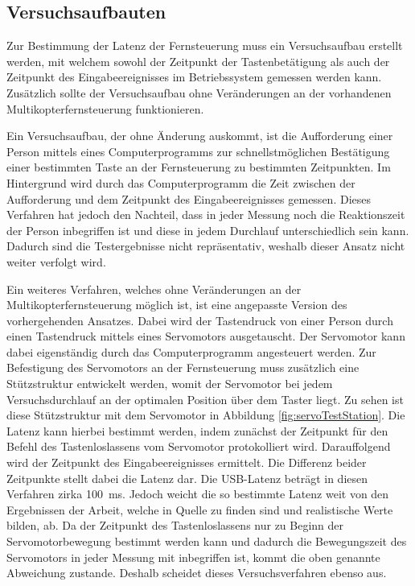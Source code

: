\subsection{Versuchsaufbauten}
Zur Bestimmung der Latenz der Fernsteuerung muss ein Versuchsaufbau erstellt werden, mit welchem sowohl der Zeitpunkt der Tastenbetätigung als auch der Zeitpunkt des Eingabeereignisses im Betriebssystem gemessen werden kann. Zusätzlich sollte der Versuchsaufbau ohne Veränderungen an der vorhandenen Multikopterfernsteuerung funktionieren.

Ein Versuchsaufbau, der ohne Änderung auskommt, ist die Aufforderung einer Person mittels eines Computerprogramms zur schnellstmöglichen Bestätigung einer bestimmten Taste an der Fernsteuerung zu bestimmten Zeitpunkten. Im Hintergrund wird durch das Computerprogramm die Zeit zwischen der Aufforderung und dem Zeitpunkt des Eingabeereignisses gemessen. Dieses Verfahren hat jedoch den Nachteil, dass in jeder Messung noch die Reaktionszeit der Person inbegriffen ist und diese in jedem Durchlauf unterschiedlich sein kann. Dadurch sind die Testergebnisse nicht repräsentativ, weshalb dieser Ansatz nicht weiter verfolgt wird.

Ein weiteres Verfahren, welches ohne Veränderungen an der Multikopterfernsteuerung möglich ist, ist eine angepasste Version des vorhergehenden Ansatzes. Dabei wird der Tastendruck von einer Person durch einen Tastendruck mittels eines Servomotors ausgetauscht. Der Servomotor kann dabei eigenständig durch das Computerprogramm angesteuert werden. Zur Befestigung des Servomotors an der Fernsteuerung muss zusätzlich eine Stützstruktur entwickelt werden, womit der Servomotor bei jedem Versuchsdurchlauf an der optimalen Position über dem Taster liegt. Zu sehen ist diese Stützstruktur mit dem Servomotor in Abbildung \ref{fig:servoTestStation}. Die Latenz kann hierbei bestimmt werden, indem zunächst der Zeitpunkt für den Befehl des Tastenloslassens vom Servomotor protokolliert wird. Darauffolgend wird der Zeitpunkt des Eingabeereignisses ermittelt. Die Differenz beider Zeitpunkte stellt dabei die Latenz dar. Die \acs{USB}-Latenz beträgt in diesen Verfahren zirka 100~ms. Jedoch weicht die so bestimmte Latenz weit von den Ergebnissen der Arbeit, welche in Quelle \cite{wimmerLatenzStation} zu finden sind und realistische Werte bilden, ab. Da der Zeitpunkt des Tastenloslassens nur zu Beginn der Servomotorbewegung bestimmt werden kann und dadurch die Bewegungszeit des Servomotors in jeder Messung mit inbegriffen ist, kommt die oben genannte Abweichung zustande. Deshalb scheidet dieses Versuchsverfahren ebenso aus.


